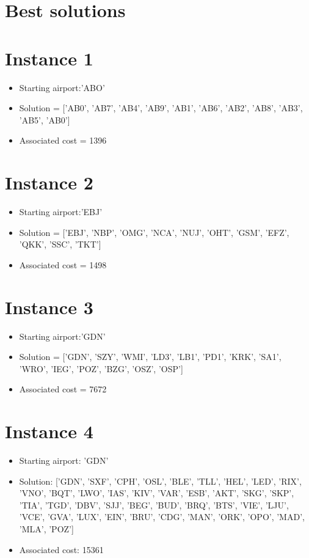 \section{Best solutions}

\section*{Instance 1}
\begin{itemize}
    \item Starting airport:'ABO'
    \item Solution = ['AB0', 'AB7', 'AB4', 'AB9', 'AB1', 'AB6', 'AB2', 'AB8', 'AB3', 'AB5', 'AB0']
    \item Associated cost = 1396
\end{itemize}

\section*{Instance 2}
\begin{itemize}
    \item Starting airport:'EBJ'
    \item Solution = ['EBJ', 'NBP', 'OMG', 'NCA', 'NUJ', 'OHT', 'GSM', 'EFZ', 'QKK', 'SSC', 'TKT']
    \item Associated cost = 1498
\end{itemize}
\section*{Instance 3}
\begin{itemize}
    \item Starting airport:'GDN'
    \item Solution = ['GDN', 'SZY', 'WMI', 'LD3', 'LB1', 'PD1', 'KRK', 'SA1', 'WRO', 'IEG', 'POZ', 'BZG', 'OSZ', 'OSP']
    \item Associated cost = 7672
\end{itemize}

\section*{Instance 4}

\begin{itemize}
    \item Starting airport: 'GDN'
    \item Solution: ['GDN', 'SXF', 'CPH', 'OSL', 'BLE', 'TLL', 'HEL', 'LED', 'RIX', 'VNO', 'BQT', 'LWO', 'IAS', 'KIV', 'VAR', 'ESB', 'AKT', 'SKG', 'SKP', 'TIA', 'TGD', 'DBV', 'SJJ', 'BEG', 'BUD', 'BRQ', 'BTS', 'VIE', 'LJU', 'VCE', 'GVA', 'LUX', 'EIN', 'BRU', 'CDG', 'MAN', 'ORK', 'OPO', 'MAD', 'MLA', 'POZ']
    \item Associated cost: 15361
\end{itemize}


